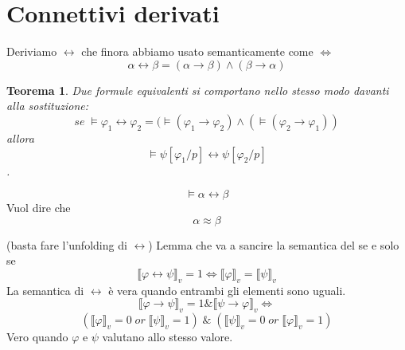 \documentclass{article}
\newtheorem{theorem}{Teorema}
\theoremstyle{break}
\theoremstyle{break}
\theoremstyle{break}
\theoremstyle{break}
\begin{document}
\section{Connettivi derivati}
Deriviamo \( \leftrightarrow \) che finora abbiamo usato semanticamente come \( \Leftrightarrow \) 
\[
  \alpha \leftrightarrow \beta = (\alpha \to \beta) \wedge (\beta \to \alpha)
\] 
\begin{theorem}
  Due formule equivalenti si comportano nello stesso modo davanti alla sostituzione:
  \[
    se\; \models \varphi_1 \leftrightarrow \varphi_2 = (\models (\varphi_1 \to \varphi_2) \wedge (\models (\varphi_2 \to \varphi_1))
  \] 
  allora
  \[
    \models \psi[\varphi_1/p] \leftrightarrow \psi[\varphi_2/p]
  \].
\end{theorem}
\[
  \models \alpha \leftrightarrow \beta
\] Vuol dire che
\[
  \alpha \approx \beta
\] 
\begin{exercise}[a casa]
  (basta fare l'unfolding di \( \leftrightarrow \))
  Lemma che va a sancire la semantica del se e solo se
  \[
    \llbracket \varphi \leftrightarrow \psi\rrbracket_v=1 \Leftrightarrow \llbracket \varphi\rrbracket_v=\llbracket \psi\rrbracket_v
  \] 
  La semantica di \( \leftrightarrow \) è vera quando entrambi gli elementi sono uguali. 
  \[
    \llbracket \varphi \to \psi\rrbracket_v=1 \& \llbracket \psi \to \varphi\rrbracket_v \Leftrightarrow
  \] 
  \[
    (\llbracket \varphi\rrbracket_v=0\; or\; \llbracket \psi\rrbracket_v=1)\; \&\; (\llbracket \psi\rrbracket_v=0\; or\; \llbracket \varphi\rrbracket_v=1) 
  \] 
  Vero quando \( \varphi \) e \( \psi \) valutano allo stesso valore.
\end{exercise}
\end{document}
